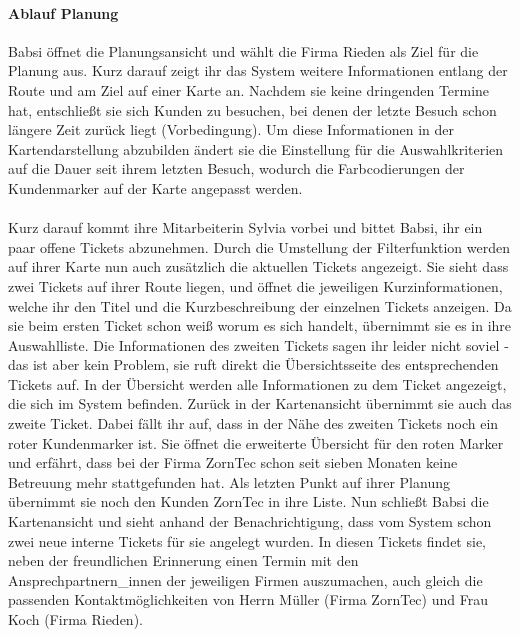 \documentclass[Bachelorarbeit.tex]{subfiles}
\begin{document}
\paragraph*{Ablauf Planung}
Babsi öffnet die Planungsansicht und wählt die Firma Rieden als Ziel für die Planung aus.
Kurz darauf zeigt ihr das System weitere Informationen entlang der Route und am Ziel auf einer Karte an.
Nachdem sie keine dringenden Termine hat, entschließt sie sich Kunden zu besuchen, bei denen der letzte Besuch schon längere Zeit zurück liegt (Vorbedingung).
Um diese Informationen in der Kartendarstellung abzubilden ändert sie die Einstellung für die Auswahlkriterien auf die Dauer seit ihrem letzten Besuch, wodurch die Farbcodierungen der Kundenmarker auf der Karte angepasst werden.\\
\\
Kurz darauf kommt ihre Mitarbeiterin Sylvia vorbei und bittet Babsi, ihr ein paar offene Tickets abzunehmen. 
Durch die Umstellung der Filterfunktion werden auf ihrer Karte nun auch zusätzlich die aktuellen Tickets angezeigt.
Sie sieht dass zwei Tickets auf ihrer Route liegen, und öffnet die jeweiligen Kurzinformationen, welche ihr den Titel und die Kurzbeschreibung der einzelnen Tickets anzeigen. 
Da sie beim ersten Ticket schon weiß worum es sich handelt, übernimmt sie es in ihre Auswahlliste.
Die Informationen des zweiten Tickets sagen ihr leider nicht soviel - das ist aber kein Problem, sie ruft direkt die Übersichtsseite des entsprechenden Tickets auf.
In der Übersicht werden alle Informationen zu dem Ticket angezeigt, die sich im System befinden.
Zurück in der Kartenansicht übernimmt sie auch das zweite Ticket. 
Dabei fällt ihr auf, dass in der Nähe des zweiten Tickets noch ein roter Kundenmarker ist.
Sie öffnet die erweiterte Übersicht für den roten Marker und erfährt, dass bei der Firma ZornTec schon seit sieben Monaten keine Betreuung mehr stattgefunden hat.
Als letzten Punkt auf ihrer Planung übernimmt sie noch den Kunden ZornTec in ihre Liste. 
Nun schließt Babsi die Kartenansicht und sieht anhand der Benachrichtigung, dass vom System schon zwei neue interne Tickets für sie angelegt wurden.
In diesen Tickets findet sie, neben der freundlichen Erinnerung einen Termin mit den Ansprechpartnern\_innen der jeweiligen Firmen auszumachen, auch gleich die passenden Kontaktmöglichkeiten von Herrn Müller (Firma ZornTec) und Frau Koch (Firma Rieden).
\newpage
\end{document}
